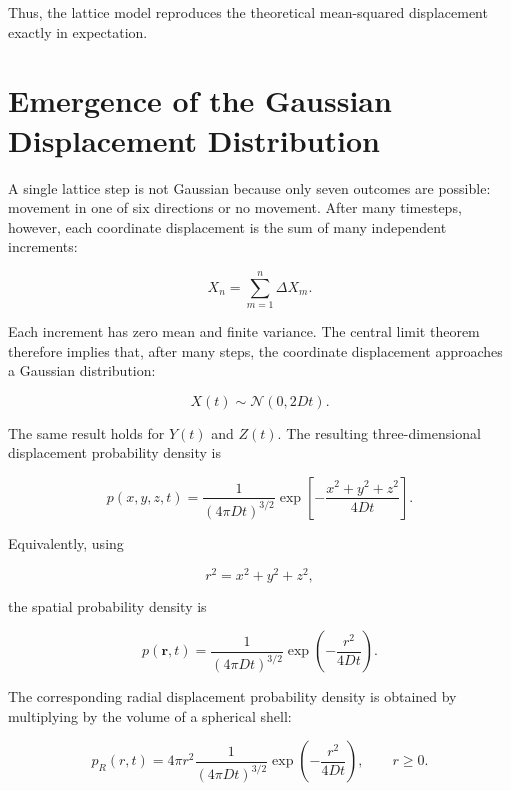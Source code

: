 \documentclass[11pt]{article}
\begin{document}
Thus, the lattice model reproduces the theoretical mean-squared displacement exactly in expectation.

\section{Emergence of the Gaussian Displacement Distribution}

A single lattice step is not Gaussian because only seven outcomes are possible: movement in one of six directions or no movement. After many timesteps, however, each coordinate displacement is the sum of many independent increments:

\begin{equation}
    X_n
    =
    \sum_{m=1}^{n}\Delta X_m.
\end{equation}

Each increment has zero mean and finite variance. The central limit theorem therefore implies that, after many steps, the coordinate displacement approaches a Gaussian distribution:

\begin{equation}
    X(t)
    \sim
    \mathcal{N}(0,2Dt).
\end{equation}

The same result holds for \(Y(t)\) and \(Z(t)\). The resulting three-dimensional displacement probability density is

\begin{equation}
    p(x,y,z,t)
    =
    \frac{1}{(4\pi Dt)^{3/2}}
    \exp\left[
        -\frac{x^2+y^2+z^2}{4Dt}
    \right].
\end{equation}

Equivalently, using

\begin{equation}
    r^2=x^2+y^2+z^2,
\end{equation}

the spatial probability density is

\begin{equation}
    p(\bm{r},t)
    =
    \frac{1}{(4\pi Dt)^{3/2}}
    \exp\left(
        -\frac{r^2}{4Dt}
    \right).
\end{equation}

The corresponding radial displacement probability density is obtained by multiplying by the volume of a spherical shell:

\begin{equation}
    p_R(r,t)
    =
    4\pi r^2
    \frac{1}{(4\pi Dt)^{3/2}}
    \exp\left(
        -\frac{r^2}{4Dt}
    \right),
    \qquad r\geq0.
\end{equation}
\end{document}
